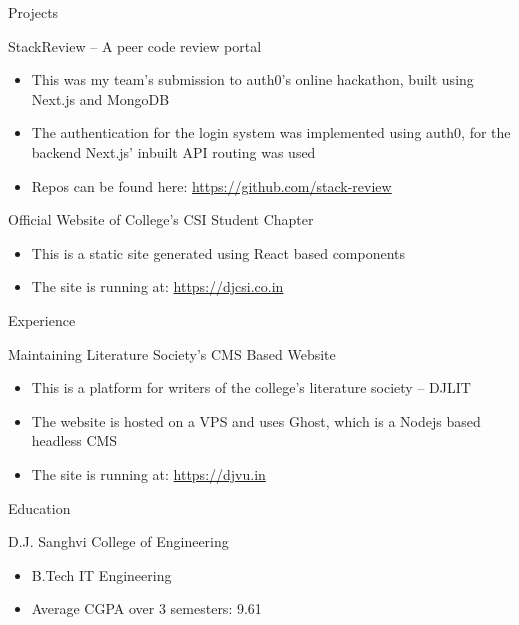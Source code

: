 \documentclass{article}
\newlength{\tabin}
\newlength{\secsep}
\newcommand{\lineunder}{\vspace*{-8pt} \\ \hspace*{-6pt} \hrulefill \\ \vspace*{-15pt}}
\newenvironment{tabbedsection}[1]{
  \begin{list}{}{
      \setlength{\itemsep}{0pt}
      \setlength{\labelsep}{0pt}
      \setlength{\labelwidth}{0pt}
      \setlength{\leftmargin}{\tabin}
      \setlength{\rightmargin}{\tabin}
      \setlength{\listparindent}{0pt}
      \setlength{\parsep}{0pt}
      \setlength{\parskip}{0pt}
      \setlength{\partopsep}{0pt}
      \setlength{\topsep}{#1}
    }
  \item[]
}{\end{list}}
\newenvironment{resume_section}[1]{
  \filbreak
  \vspace{2\secsep}
  \textsc{\large#1}
  \lineunder
  \begin{tabbedsection}{\secsep}
}{\end{tabbedsection}}
\newenvironment{resume_subsection}[2][]{
  \textbf{#2} \hfill {\footnotesize #1} \hspace{2em}
  \begin{tabbedsection}{0.5\secsep}
}{\end{tabbedsection}}
\newenvironment{subitems}{
  \renewcommand{\labelitemi}{-}
  \begin{itemize}
      \setlength{\labelsep}{1em}
}{\end{itemize}}
\begin{document}
\begin{resume_section}{Projects}
    \begin{resume_subsection}{StackReview -- A peer code review portal}
        \begin{subitems}
            \item This was my team's submission to auth0's online hackathon, built using Next.js and MongoDB
            \item The authentication for the login system was implemented using auth0, for the backend Next.js' inbuilt API routing was used
            \item Repos can be found here: \href{https://github.com/stack-review}{https://github.com/stack-review}
        \end{subitems}
    \end{resume_subsection}
    \begin{resume_subsection}{Official Website of College's CSI Student Chapter}
        \begin{subitems}
            \item This is a static site generated using React based components
            \item The site is running at: \href{https://djcsi.co.in}{https://djcsi.co.in}
        \end{subitems}
    \end{resume_subsection}
\end{resume_section}

\begin{resume_section}{Experience}
    \begin{resume_subsection}{Maintaining Literature Society's CMS Based Website}
        \begin{subitems}
            \item This is a platform for writers of the college's literature society -- DJLIT
            \item The website is hosted on a VPS and uses Ghost, which is a Nodejs based headless CMS
            \item The site is running at: \href{https://djvu.in}{https://djvu.in}
        \end{subitems}
    \end{resume_subsection}
\end{resume_section}

\begin{resume_section}{Education}
    \begin{resume_subsection}[2019 - 2023 (expected)]{D.J. Sanghvi College of Engineering}
        \begin{subitems}
            \item B.Tech IT Engineering
            \item Average CGPA over 3 semesters: 9.61
        \end{subitems}
  \end{resume_subsection}
\end{resume_section}

\vspace{1cm}
\end{document}
